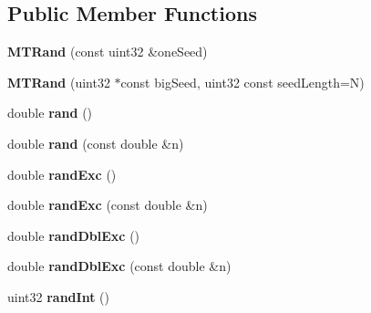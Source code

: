 \subsection*{Public Member Functions}
\begin{DoxyCompactItemize}
\item 
\hypertarget{class_picto_1_1_m_t_rand_a8563a68b98ecf0a65d0d28c26ae6de32}{{\bfseries M\-T\-Rand} (const uint32 \&one\-Seed)}\label{class_picto_1_1_m_t_rand_a8563a68b98ecf0a65d0d28c26ae6de32}

\item 
\hypertarget{class_picto_1_1_m_t_rand_a3a568121414dcb2870fadfd86bbe647a}{{\bfseries M\-T\-Rand} (uint32 $\ast$const big\-Seed, uint32 const seed\-Length=N)}\label{class_picto_1_1_m_t_rand_a3a568121414dcb2870fadfd86bbe647a}

\item 
\hypertarget{class_picto_1_1_m_t_rand_a802c5c5b2041321043475e38e5ca96ff}{double {\bfseries rand} ()}\label{class_picto_1_1_m_t_rand_a802c5c5b2041321043475e38e5ca96ff}

\item 
\hypertarget{class_picto_1_1_m_t_rand_a173850a358cff660d32c2e6ec0178c32}{double {\bfseries rand} (const double \&n)}\label{class_picto_1_1_m_t_rand_a173850a358cff660d32c2e6ec0178c32}

\item 
\hypertarget{class_picto_1_1_m_t_rand_ab383ba3e768944b9f67a13cab61c76ef}{double {\bfseries rand\-Exc} ()}\label{class_picto_1_1_m_t_rand_ab383ba3e768944b9f67a13cab61c76ef}

\item 
\hypertarget{class_picto_1_1_m_t_rand_aa2a19024ff954a7f5d5ddfac24beca84}{double {\bfseries rand\-Exc} (const double \&n)}\label{class_picto_1_1_m_t_rand_aa2a19024ff954a7f5d5ddfac24beca84}

\item 
\hypertarget{class_picto_1_1_m_t_rand_a1cab54c7b0bfabc8ad929e5f0305f542}{double {\bfseries rand\-Dbl\-Exc} ()}\label{class_picto_1_1_m_t_rand_a1cab54c7b0bfabc8ad929e5f0305f542}

\item 
\hypertarget{class_picto_1_1_m_t_rand_a297a9da56591633dae2ea375f55bed39}{double {\bfseries rand\-Dbl\-Exc} (const double \&n)}\label{class_picto_1_1_m_t_rand_a297a9da56591633dae2ea375f55bed39}

\item 
\hypertarget{class_picto_1_1_m_t_rand_a8fa7fcea22a16cde0c0f6c7b64419367}{uint32 {\bfseries rand\-Int} ()}\label{class_picto_1_1_m_t_rand_a8fa7fcea22a16cde0c0f6c7b64419367}


\end{DoxyCompactItemize}
